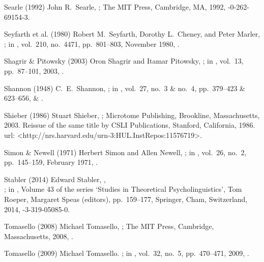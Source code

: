 \biblabel Searle (1992)
John R.\ Searle,
;
The MIT Press, Cambridge, MA, 1992,
-0-262-69154-3.

\biblabel Seyfarth et al. (1980)
Robert M.\ Seyfarth, Dorothy L.\ Cheney, and Peter Marler,
;
in ,
vol.\ 210, no.\ 4471, pp.\ 801--803, November 1980,
.

\biblabel Shagrir \& Pitowsky (2003)
Oron Shagrir and Itamar Pitowsky,
;
in ,
vol.\ 13, pp.\ 87--101, 2003,
.

\biblabel Shannon (1948)
C.\ E.\ Shannon,
;
in ,
vol.\ 27, no.\ 3 \& no.\ 4, pp.\ 379--423 \& 623--656,
 \&
.

\biblabel Shieber (1986)
Stuart Shieber,
;
Microtome Publishing, Brookline, Massachusetts, 2003.
Reissue of the same title by
CSLI Publications, Stanford, California, 1986.\\
{\sc url:} \URL<http://nrs.harvard.edu/urn-3:HUL.InstRepos:11576719>.

\biblabel Simon \& Newell (1971)
Herbert Simon and Allen Newell,
;
in ,
 vol.\ 26, no.\ 2, pp.\ 145--159, February 1971,
.

\biblabel Stabler (2014)
Edward Stabler,
,\\
;
in ,
Volume 43 of the series ‘Studies in Theoretical Psycholinguistics’,
Tom Roeper, Margaret Speas (editors),
pp.\ 159--177,
Springer, Cham, Switzerland, 2014,
-3-319-05085-0.

\biblabel Tomasello (2008)
Michael Tomasello,
;
The MIT Press, Cambridge, Massachusetts, 2008,
.

\biblabel Tomasello (2009)
Michael Tomasello.
;
in ,
vol.\ 32, no.\ 5, pp.\ 470--471, 2009,
.

